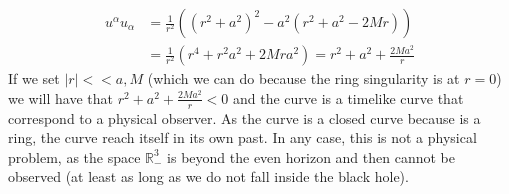 \begin{equation}
\begin{aligned}
  u^\alpha u_\alpha&=\frac{1}{r^2} \left((r^2+a^2)^2 - a^2 (r^2+a^2-2M r) \right) \nonumber \\
  &=\frac{1}{r^2}(r^4+r^2 a^2+2 M r a^2)=r^2+a^2+\frac{2 M a^2}{r}
  \end{aligned}
\end{equation}
If we set $|r|<<a,M$ (which we can do because the ring singularity is at $r=0$) we will have that $r^2+a^2+\frac{2 M a^2}{r}<0$ and the curve is a timelike curve that correspond to a physical observer. As the curve is a closed curve because is a ring, the curve reach itself in its own past. In any case, this is not a physical problem, as the space  $\mathbb{R}_{-}^3$ is beyond the even horizon and then cannot be observed (at least as long as we do not fall inside the black hole).


